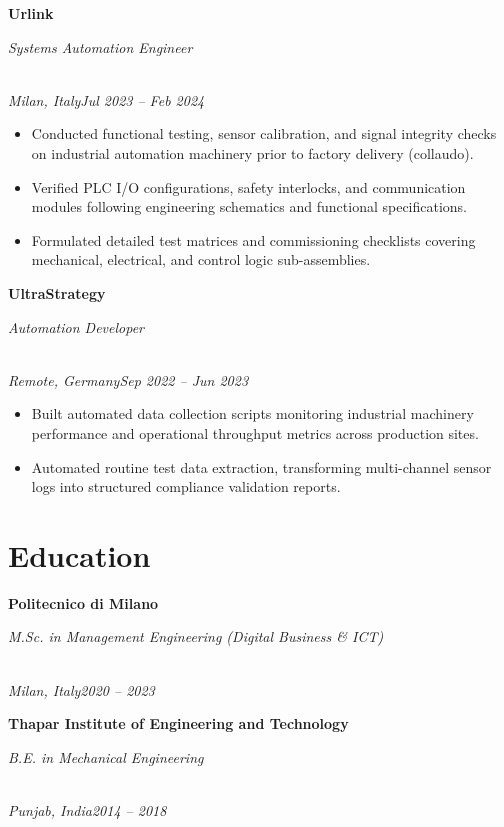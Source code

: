 \documentclass[a4paper,10pt]{article}
\newcommand{\role}[4]{\vspace{3pt}\noindent\hspace{0.6em}\parbox[t]{0.38\textwidth}{\raggedright\textbf{#1}}\hfill\parbox[t]{0.58\textwidth}{\raggedleft\textit{#2}}\\{\textit{#3}\hfill\textit{#4}}\vspace{1pt}}
\begin{document}
\role{Urlink}{Systems Automation Engineer}{Milan, Italy}{Jul 2023 -- Feb 2024}
\begin{itemize}
\item Conducted functional testing, sensor calibration, and signal integrity checks on industrial automation machinery prior to factory delivery (collaudo).
\item Verified PLC I/O configurations, safety interlocks, and communication modules following engineering schematics and functional specifications.
\item Formulated detailed test matrices and commissioning checklists covering mechanical, electrical, and control logic sub-assemblies.
\end{itemize}

\role{UltraStrategy}{Automation Developer}{Remote, Germany}{Sep 2022 -- Jun 2023}
\begin{itemize}
\item Built automated data collection scripts monitoring industrial machinery performance and operational throughput metrics across production sites.
\item Automated routine test data extraction, transforming multi-channel sensor logs into structured compliance validation reports.
\end{itemize}

\section{Education}
\role{Politecnico di Milano}{M.Sc. in Management Engineering (Digital Business \& ICT)}{Milan, Italy}{2020 -- 2023}
\role{Thapar Institute of Engineering and Technology}{B.E. in Mechanical Engineering}{Punjab, India}{2014 -- 2018}
\end{document}
